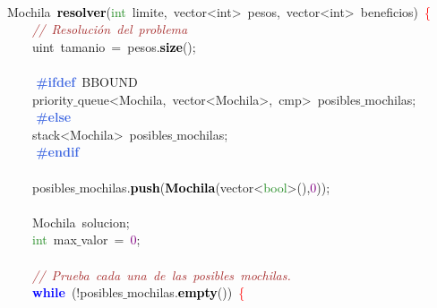 \mbox{} \\
\mbox{}\textcolor{TealBlue}{Mochila}\ \textbf{\textcolor{Black}{resolver}}\textcolor{BrickRed}{(}\textcolor{ForestGreen}{int}\ limite\textcolor{BrickRed}{,}\ \textcolor{TealBlue}{vector\textless{}int\textgreater{}\ pesos,\ vector\textless{}int\textgreater{}}\ beneficios\textcolor{BrickRed}{)}\ \textcolor{Red}{\{} \\
\mbox{}\ \ \ \ \textit{\textcolor{Brown}{//\ Resolución\ del\ problema}} \\
\mbox{}\ \ \ \ \textcolor{TealBlue}{uint}\ tamanio\ \textcolor{BrickRed}{=}\ pesos\textcolor{BrickRed}{.}\textbf{\textcolor{Black}{size}}\textcolor{BrickRed}{();} \\
\mbox{}\ \ \ \  \\
\mbox{}\textbf{\textcolor{RoyalBlue}{\ \ \ \ \#ifdef}}\ BBOUND \\
\mbox{}\ \ \ \ \textcolor{TealBlue}{priority$\_$queue\textless{}Mochila,\ vector\textless{}Mochila\textgreater{},\ cmp\textgreater{}}\ posibles$\_$mochilas\textcolor{BrickRed}{;} \\
\mbox{}\textbf{\textcolor{RoyalBlue}{\ \ \ \ \#else}} \\
\mbox{}\ \ \ \ \textcolor{TealBlue}{stack\textless{}Mochila\textgreater{}}\ posibles$\_$mochilas\textcolor{BrickRed}{;} \\
\mbox{}\textbf{\textcolor{RoyalBlue}{\ \ \ \ \#endif}} \\
\mbox{}\ \ \ \  \\
\mbox{}\ \ \ \ posibles$\_$mochilas\textcolor{BrickRed}{.}\textbf{\textcolor{Black}{push}}\textcolor{BrickRed}{(}\textbf{\textcolor{Black}{Mochila}}\textcolor{BrickRed}{(}vector\textcolor{BrickRed}{\textless{}}\textcolor{ForestGreen}{bool}\textcolor{BrickRed}{\textgreater{}(),}\textcolor{Purple}{0}\textcolor{BrickRed}{));} \\
\mbox{}\ \ \ \  \\
\mbox{}\ \ \ \ \textcolor{TealBlue}{Mochila}\ solucion\textcolor{BrickRed}{;} \\
\mbox{}\ \ \ \ \textcolor{ForestGreen}{int}\ max$\_$valor\ \textcolor{BrickRed}{=}\ \textcolor{Purple}{0}\textcolor{BrickRed}{;} \\
\mbox{}\ \ \ \  \\
\mbox{}\ \ \ \ \textit{\textcolor{Brown}{//\ Prueba\ cada\ una\ de\ las\ posibles\ mochilas.}} \\
\mbox{}\ \ \ \ \textbf{\textcolor{Blue}{while}}\ \textcolor{BrickRed}{(!}posibles$\_$mochilas\textcolor{BrickRed}{.}\textbf{\textcolor{Black}{empty}}\textcolor{BrickRed}{())}\ \textcolor{Red}{\{} \\
